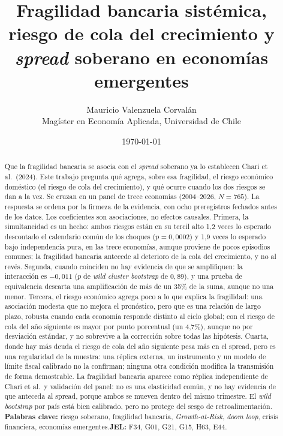 \documentclass[12pt,letterpaper]{article}
\title{Fragilidad bancaria sistémica, riesgo de cola del crecimiento y
\textit{spread} soberano en economías emergentes}
\author{Mauricio Valenzuela Corvalán\\[2pt]
\small Magíster en Economía Aplicada, Universidad de Chile}
\date{\today}
\newcommand{\1}{\mathbf{1}}
\theoremstyle{plain}
\theoremstyle{definition}
\begin{document}
\maketitle

\begin{abstract}
\noindent
Que la fragilidad bancaria se asocia con el \textit{spread} soberano ya lo establecen Chari et al.\ (2024). Este trabajo pregunta qué agrega, sobre esa fragilidad, el riesgo económico doméstico (el riesgo de cola del crecimiento), y qué ocurre cuando los dos riesgos se dan a la vez. Se cruzan en un panel de trece economías (2004--2026, $N=765$). La respuesta se ordena por la firmeza de la evidencia, con ocho preregistros fechados antes de los datos. Los coeficientes son asociaciones, no efectos causales. Primera, la simultaneidad es un hecho: ambos riesgos están en su tercil alto 1,2 veces lo esperado descontado el calendario común de los choques ($p=0{,}0002$) y 1,9 veces lo esperado bajo independencia pura, en las trece economías, aunque proviene de pocos episodios comunes; la fragilidad bancaria antecede al deterioro de la cola del crecimiento, y no al revés. Segunda, cuando coinciden no hay evidencia de que se amplifiquen: la interacción es $-0{,}011$ ($p$ de \textit{wild cluster bootstrap} de $0{,}89$), y una prueba de equivalencia descarta una amplificación de más de un 35\% de la suma, aunque no una menor. Tercera, el riesgo económico agrega poco a lo que explica la fragilidad: una asociación modesta que no mejora el pronóstico, pero que es una relación de largo plazo, robusta cuando cada economía responde distinto al ciclo global; con el riesgo de cola del año siguiente es mayor por punto porcentual (un 4,7\%), aunque no por desviación estándar, y no sobrevive a la corrección sobre todas las hipótesis. Cuarta, donde hay más deuda el riesgo de cola del año siguiente pesa más en el spread, pero es una regularidad de la muestra: una réplica externa, un instrumento y un modelo de límite fiscal calibrado no la confirman; ninguna otra condición modifica la transmisión de forma demostrable. La fragilidad bancaria aparece como réplica independiente de Chari et al.\ y validación del panel: no es una elasticidad común, y no hay evidencia de que anteceda al spread, porque ambos se mueven dentro del mismo trimestre. El \textit{wild bootstrap} por país está bien calibrado, pero no protege del sesgo de retroalimentación.\\[4pt]
\noindent\textbf{Palabras clave:} riesgo soberano, fragilidad bancaria, \textit{Growth-at-Risk},
\textit{doom loop}, crisis financiera, economías emergentes.\quad\textbf{JEL:} F34, G01,
G21, G15, H63, E44.
\end{abstract}


\end{document}
